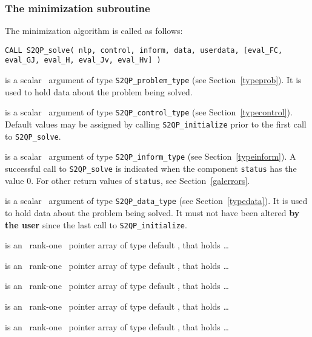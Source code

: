 \documentclass{galahad}
\newcommand{\packagename}{S2QP}
\begin{document}

\subsubsection{The minimization subroutine}
The minimization algorithm is called as follows:
\vspace*{1mm}

\hspace{8mm}
{\tt CALL \packagename\_solve( nlp, control, inform, data, userdata,
          [eval\_FC, eval\_GJ, eval\_H, eval\_Jv, eval\_Hv] )}

\vspace*{-3mm}
\begin{description}
 is a scalar \intentinout\ argument of type
{\tt \packagename\_problem\_type}
(see Section~\ref{typeprob}).
It is used to hold data about the problem being solved.

 is a scalar \intentin\ argument of type
{\tt \packagename\_control\_type}
(see Section~\ref{typecontrol}). Default values may be assigned by calling
{\tt \packagename\_initialize}
prior to the first call to
{\tt \packagename\_solve}.

 is a scalar \intentout\ argument of type
{\tt \packagename\_inform\_type}
(see Section~\ref{typeinform}). A successful call to
{\tt \packagename\_solve}
is indicated when the  component {\tt status} has the value 0.
For other return values of {\tt status}, see Section~\ref{galerrors}.

 is a scalar \intentinout\ argument of type
{\tt \packagename\_data\_type}
(see Section~\ref{typedata}). It is used to hold data about the problem being
solved. It must not have been altered {\bf by the user} since the last call to
{\tt \packagename\_initialize}.


 is an \optional\ rank-one \intentin\ pointer array of type
 default \realdp,  that holds \ldots

 is an \optional\ rank-one \intentin\ pointer array of type
 default \realdp,  that holds \ldots

 is an \optional\ rank-one \intentin\ pointer array of type
 default \realdp,  that holds \ldots

 is an \optional\ rank-one \intentin\ pointer array of type
 default \realdp,  that holds \ldots

 is an \optional\ rank-one \intentin\ pointer array of type
 default \realdp,  that holds \ldots

\end{description}
\end{document}
